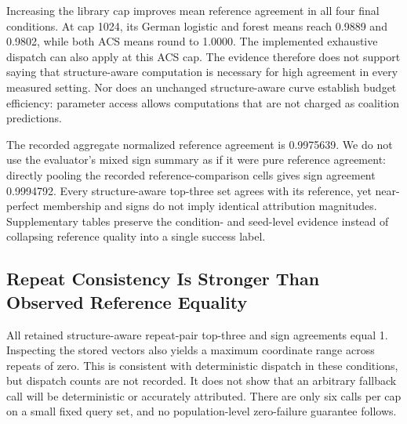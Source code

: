\documentclass{article}
\begin{document}
Increasing the library cap improves mean reference agreement in all four final conditions. At cap 1024, its German logistic and forest means reach 0.9889 and 0.9802, while both ACS means round to 1.0000. The implemented exhaustive dispatch can also apply at this ACS cap. The evidence therefore does not support saying that structure-aware computation is necessary for high agreement in every measured setting. Nor does an unchanged structure-aware curve establish budget efficiency: parameter access allows computations that are not charged as coalition predictions.

The recorded aggregate normalized reference agreement is 0.9975639. We do not use the evaluator's mixed sign summary as if it were pure reference agreement: directly pooling the recorded reference-comparison cells gives sign agreement 0.9994792. Every structure-aware top-three set agrees with its reference, yet near-perfect membership and signs do not imply identical attribution magnitudes. Supplementary tables preserve the condition- and seed-level evidence instead of collapsing reference quality into a single success label.

\subsection{Repeat Consistency Is Stronger Than Observed Reference Equality}
All retained structure-aware repeat-pair top-three and sign agreements equal 1. Inspecting the stored vectors also yields a maximum coordinate range across repeats of zero. This is consistent with deterministic dispatch in these conditions, but dispatch counts are not recorded. It does not show that an arbitrary fallback call will be deterministic or accurately attributed. There are only six calls per cap on a small fixed query set, and no population-level zero-failure guarantee follows.
\end{document}
